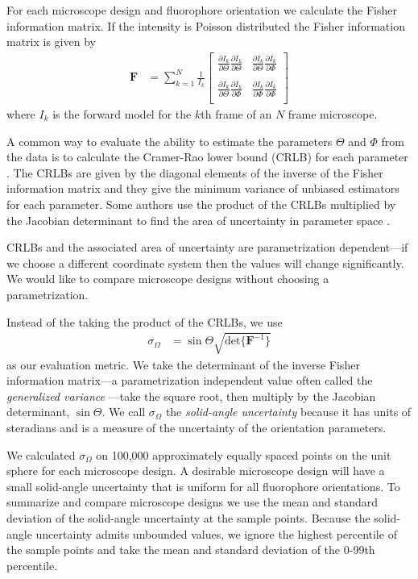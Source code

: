 \documentclass[10pt]{article}
\providecommand{\mb}[1]{\mathbf{#1}}
\begin{document}
For each microscope design and fluorophore orientation we calculate the Fisher
information matrix. If the intensity is Poisson distributed the
Fisher information matrix is given by
\begin{align}
  \mb{F} &= \sum_{k=1}^N \frac{1}{I_k}
  \begin{bmatrix}
    \frac{\partial I_k}{\partial \Theta}\frac{\partial I_k}{\partial \Theta}&\frac{\partial I_k}{\partial \Theta}\frac{\partial I_k}{\partial \Phi}\\\\
    \frac{\partial I_k}{\partial \Theta}\frac{\partial I_k}{\partial \Phi}&\frac{\partial I_k}{\partial \Phi}\frac{\partial I_k}{\partial \Phi}\\    
  \end{bmatrix}
\end{align}
where $I_k$ is the forward model for the $k$th frame of an $N$ frame microscope. 

A common way to evaluate the ability to estimate the parameters $\Theta$ and
$\Phi$ from the data is to calculate the Cramer-Rao lower bound (CRLB) for each
parameter \cite{kay1993}. The CRLBs are given by the diagonal elements of the
inverse of the Fisher information matrix and they give the minimum variance of
unbiased estimators for each parameter. Some authors use the product of the
CRLBs multiplied by the Jacobian determinant to find the area of uncertainty in
parameter space \cite{agrawal2012}.

CRLBs and the associated area of uncertainty are parametrization dependent---if
we choose a different coordinate system then the values will change
significantly. We would like to compare microscope designs without choosing a
parametrization.

Instead of the taking the product of the CRLBs, we use
\begin{align}
  \sigma_{\Omega} &= \sin\Theta\sqrt{\text{det}\{\mb{F}^{-1}\}}
\end{align}
as our evaluation metric. We take the determinant of the inverse Fisher
information matrix---a parametrization independent value often called the
\emph{generalized variance} \cite{anderson1958}---take the square root, then
multiply by the Jacobian determinant, $\sin\Theta$. We call $\sigma_{\Omega}$ the
\emph{solid-angle uncertainty} because it has units of steradians and is a
measure of the uncertainty of the orientation parameters.

We calculated $\sigma_{\Omega}$ on 100,000 approximately equally spaced points
on the unit sphere for each microscope design. A desirable microscope design
will have a small solid-angle uncertainty that is uniform for all fluorophore
orientations. To summarize and compare microscope designs we use the mean and
standard deviation of the solid-angle uncertainty at the sample points. Because
the solid-angle uncertainty admits unbounded values, we ignore the highest
percentile of the sample points and take the mean and standard deviation of the
0-99th percentile.
\end{document}
